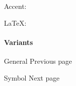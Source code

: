 Accent:


LaTeX: \texttt{\ }

\paragraph{Variants}\label{variants}

{ }

\href{/docs/reference/symbols/sym/}{\pandocbounded{}}

{ General } { Previous page }

\href{/docs/reference/symbols/symbol/}{\pandocbounded{}}

{ Symbol } { Next page }

